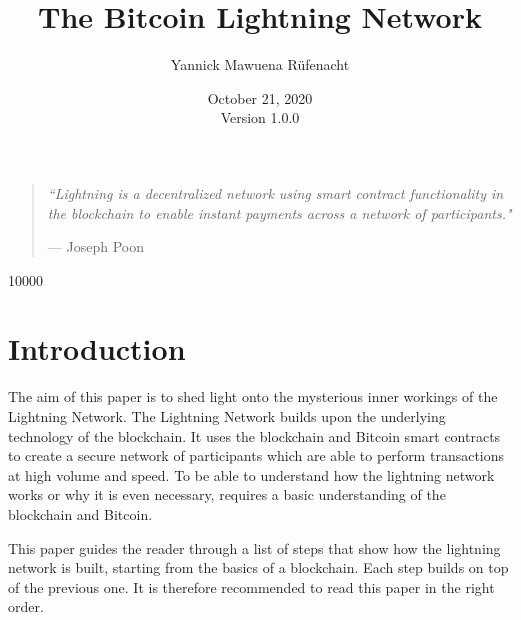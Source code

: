 \documentclass[a4paper, 12pt]{report}
\newcommand{\hsp}{\hspace{20pt}}
\begin{document}
\title{\Large{\textbf{The Bitcoin Lightning Network}}}
\author{Yannick Mawuena Rüfenacht}
\date{October 21, 2020\\Version 1.0.0}
\maketitle

\begin{quote}
\vspace*{\fill}
\textit{``Lightning is a decentralized network using smart contract functionality in the blockchain to enable instant payments across a network of participants."}
\par\raggedleft--- \textup{Joseph Poon}
\vspace*{\fill}
\end{quote}

\tableofcontents
\listoffigures

\setlength{\parskip}{1em}
\setlength{\parindent}{0em}
\titleformat{\chapter}[hang]{\LARGE\bfseries}{\thechapter\hsp\textcolor{gray75}{|}\hsp}{0pt}{\LARGE\bfseries}
\titleformat{\section}[hang]{\large\bfseries}{\thesection\hsp\textcolor{gray75}{|}\hsp}{0pt}{\large\bfseries}

 10000
\raggedbottom

\chapter{Introduction}
\par The aim of this paper is to shed light onto the mysterious inner workings of the Lightning Network. The Lightning Network builds upon the underlying technology of the blockchain. It uses the blockchain and Bitcoin smart contracts to create a secure network of participants which are able to perform transactions at high volume and speed. To be able to understand how the lightning network works or why it is even necessary, requires a basic understanding of the blockchain and Bitcoin.
\par This paper guides the reader through a list of steps that show how the lightning network is built, starting from the basics of a blockchain. Each step builds on top of the previous one. It is therefore recommended to read this paper in the right order.
\end{document}
